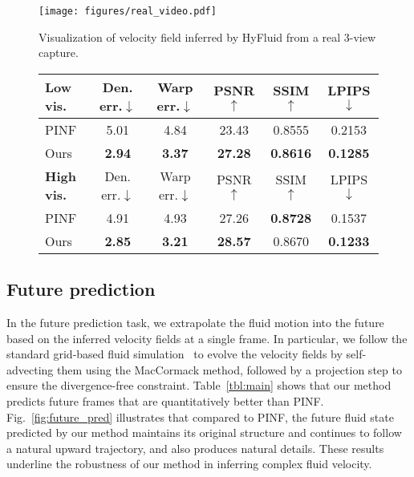 \documentclass{article}
\newcommand{\fig}[1]{Fig.~\ref{#1}}
\newcommand{\tbl}[1]{Table~\ref{#1}}
\newcommand{\model}{HyFluid\xspace}
\begin{document}
\begin{figure}[t]
\centering
\texttt{[image: figures/real\_video.pdf]}
\caption{Visualization of velocity field inferred by \model from a real 3-view capture.}
\label{fig:real_video}
\vspace{-0.15cm}
\end{figure} \begin{figure}[t]
    \centering
    \begin{minipage}[c]{0.48\linewidth}
        \scriptsize
        \setlength{\tabcolsep}{3pt}
        \begin{tabular}{lccccc}
        \toprule
        \textbf{Low vis.} & Den. err.$\downarrow$ & Warp err.$\downarrow$ & PSNR$\uparrow$ & SSIM$\uparrow$ & LPIPS$\downarrow$ \\
        \midrule
        PINF &5.01&4.84&23.43&0.8555&0.2153\\
        Ours &\textbf{2.94} & \textbf{3.37} & \textbf{27.28} & \textbf{0.8616} & \textbf{0.1285}\\
        \midrule
        \textbf{High vis.} & Den. err.$\downarrow$ & Warp err.$\downarrow$ & PSNR$\uparrow$ & SSIM$\uparrow$ & LPIPS$\downarrow$ \\
        \midrule
        PINF &4.91&4.93&27.26&\textbf{0.8728}&0.1537 \\
        Ours & \textbf{2.85} & \textbf{3.21} & \textbf{28.57} & 0.8670 & \textbf{0.1233} \\
        \bottomrule
        \end{tabular}
        \label{tbl:syn}
    \end{minipage}\hfill
    \begin{minipage}[c]{0.48\linewidth}
        \vspace{-0.4cm}
        \label{fig:syn}
    \end{minipage}
    \vspace{-0.3cm}
\end{figure}
 

\subsection{Future prediction} In the future prediction task, we extrapolate the fluid motion into the future based on the inferred velocity fields at a single frame. In particular, we follow the standard grid-based fluid simulation~\citep{fedkiw2001visual} to evolve the velocity fields by self-advecting them using the MacCormack method, followed by a projection step to ensure the divergence-free constraint. \tbl{tbl:main} shows that our method predicts future frames that are quantitatively better than PINF. \fig{fig:future_pred} illustrates that compared to PINF, the future fluid state predicted by our method maintains its original structure and continues to follow a natural upward trajectory, and also produces natural details. These results underline the robustness of our method in inferring complex fluid velocity. 
\end{document}
